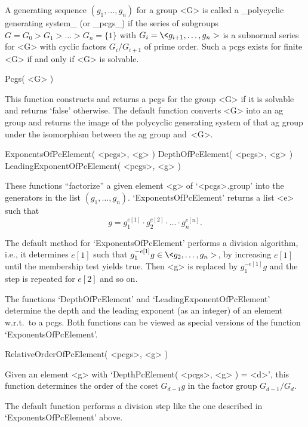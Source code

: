 

A generating sequence  $(g_1,\ldots,g_n)$ for  a  group <G> is  called  a
_polycyclic generating system_ (or _pcgs_) if the  series of subgroups $G
= G_0 > G_1 > \ldots > G_n = \{1\}$ with $G_i  = \< g_{i+1}, \ldots,
g_n  >$   is a  subnormal    series for  <G>  with  cyclic  factors
$G_i/G_{i+1}$ of prime order.  Such a pcgs  exists for finite <G> if  and
only if <G> is solvable.

\>Pcgs( <G> )

This function constructs and returns  a pcgs for the group  <G> if it  is
solvable and returns `false' otherwise. The default function converts <G>
into  an  ag group  and returns the   image  of the polycyclic generating
system of   that ag  group under  the  isomorphism between  the  ag group
and~<G>.

\>ExponentsOfPcElement( <pcgs>, <g> )
\>DepthOfPcElement( <pcgs>, <g> )
\>LeadingExponentOfPcElement( <pcgs>, <g> )

These functions ``factorize'' a given  element <g> of `<pcgs>.group' into
the  generators  in  the  list $(g_1,\ldots,g_n)$. `ExponentsOfPcElement'
returns a list <e> such that
$$ g = g_1^{e[1]} \cdot g_2^{e[2]} \cdot \ldots \cdot g_n^{e[n]}. $$

The  default   method  for `ExponentsOfPcElement'  performs   a  division
algorithm, i.e., it determines $e[1]$ such that $g_1^{-e[1]}g \in \<
g_2, \ldots, g_n >$, by increasing $e[1]$ until the membership test
yields true. Then  <g>  is replaced   by $g_1^{-e[1]}g$ and  the step  is
repeated for $e[2]$ and so on.

The  functions      `DepthOfPcElement'   and `LeadingExponentOfPcElement'
determine  the depth  and the  leading  exponent (as  an  integer)  of an
element  w.r.t.~to a  pcgs.   Both functions can   be  viewed  as special
versions of the function `ExponentsOfPcElement'.

\>RelativeOrderOfPcElement( <pcgs>, <g> )

Given  an element <g> with  `DepthPcElement(  <pcgs>, <g>  ) = <d>', this
function determines the order of the coset $G_{d-1}g$ in the factor group
$G_{d-1}/G_d$.

The default  function performs a division step  like the one described in
`ExponentsOfPcElement' above.

